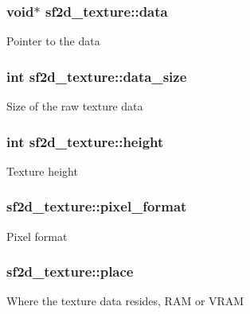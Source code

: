 \subsubsection[{data}]{\setlength{\rightskip}{0pt plus 5cm}void$\ast$ sf2d\+\_\+texture\+::data}\label{structsf2d__texture_a46673c7ce439c63554a23e6ce83b254f}
Pointer to the data \hypertarget{structsf2d__texture_a99107fa90e683bab6456da738ff9d005}{}
\subsubsection[{data\+\_\+size}]{\setlength{\rightskip}{0pt plus 5cm}int sf2d\+\_\+texture\+::data\+\_\+size}\label{structsf2d__texture_a99107fa90e683bab6456da738ff9d005}
Size of the raw texture data \hypertarget{structsf2d__texture_a055ccacd41038339dd1ded72747ccf8f}{}
\subsubsection[{height}]{\setlength{\rightskip}{0pt plus 5cm}int sf2d\+\_\+texture\+::height}\label{structsf2d__texture_a055ccacd41038339dd1ded72747ccf8f}
Texture height \hypertarget{structsf2d__texture_a1292c9a846b8593163bd3c1eaeb459c2}{}
\subsubsection[{pixel\+\_\+format}]{ sf2d\+\_\+texture\+::pixel\+\_\+format}\label{structsf2d__texture_a1292c9a846b8593163bd3c1eaeb459c2}
Pixel format \hypertarget{structsf2d__texture_ac30cfc2de337739d1a19858e4fdacaa4}{}
\subsubsection[{place}]{ sf2d\+\_\+texture\+::place}\label{structsf2d__texture_ac30cfc2de337739d1a19858e4fdacaa4}
Where the texture data resides, R\+A\+M or V\+R\+A\+M \hypertarget{structsf2d__texture_a644c43b5fde6e12c8f1e3cb0280798e1}{}
